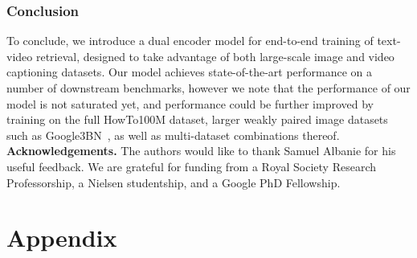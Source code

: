 \documentclass[10pt,twocolumn,letterpaper]{article}
\begin{document}
\begin{table}
\centering
\caption{Text-to-video retrieval results on the LSMDC test set.}
\label{tab:lsmdc-sota}
\end{table} 

\label{subsec:qualitative}

 \section{Conclusion}
\label{sec:conc}
To conclude, we introduce a dual encoder model for end-to-end training of text-video retrieval, designed to take advantage of both large-scale image and video captioning datasets. Our model achieves state-of-the-art performance on a number of downstream benchmarks, however we note that the performance of our model is not saturated yet, and performance could be further improved by training on the full HowTo100M dataset, larger weakly paired image datasets such as Google3BN~\cite{jia2021scaling}, as well as multi-dataset combinations thereof. 
\noindent \textbf{Acknowledgements.}
The authors would like to thank Samuel Albanie for his useful feedback. We are grateful for funding from a Royal Society Research Professorship, a Nielsen studentship, and a Google PhD Fellowship.

{\small}
\clearpage
\appendix
{}

\part{Appendix} 
\renewcommand{\thefigure}{A.\arabic{figure}}
\setcounter{figure}{0} 
\renewcommand{\thetable}{A.\arabic{table}}
\setcounter{table}{0} 
\end{document}
